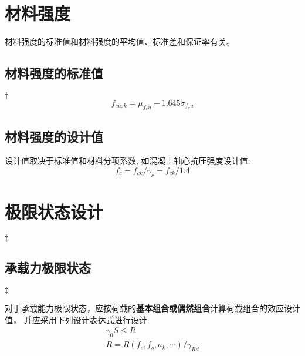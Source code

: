 
\section{材料强度}

材料强度的标准值和材料强度的平均值、标准差和保证率有关。

\subsection{材料强度的标准值}

$\dagger$
\begin{equation}
    f_{cu,k} = \mu_{f_cu} - 1.645\sigma_{f_cu}
\end{equation}

\subsection{材料强度的设计值}

设计值取决于标准值和材料分项系数, 如混凝土轴心抗压强度设计值:
\begin{equation}
    f_c = f_{ck}/\gamma_c = f_{ck}/1.4
\end{equation}

\section{极限状态设计}

$\ddagger$

\subsection{承载力极限状态}

$\ddagger$

对于承载能力极限状态，应按荷载的{\bf 基本组合或偶然组合}计算荷载组合的效应设计值，
并应采用下列设计表达式进行设计:
\begin{align}
    \gamma_0S \le R\\
    R = R(f_c, f_s, a_k, \cdots)/\gamma_{Rd}
\end{align}

